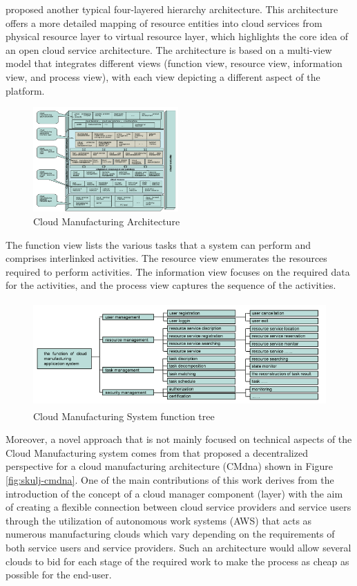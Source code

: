 \textcite{lv_multi-view_2012} proposed another typical four-layered hierarchy architecture. This architecture offers a more detailed mapping of resource entities into cloud services from physical resource layer to virtual resource layer, which highlights the core idea of an open cloud service architecture. The architecture is based on a multi-view model that integrates different views (function view, resource view, information view, and process view), with each view depicting a different aspect of the platform.


\begin{figure}[h]
    \centering
    \includegraphics[height=4cm, keepaspectratio]{images/lv-cmfg-architecture}
    \caption{\textcite{lv_multi-view_2012} Cloud Manufacturing Architecture}
    \label{fig:lv-cmfg-architecture}
\end{figure}

The function view lists the various tasks that a system can perform and comprises interlinked activities. The resource view enumerates the resources required to perform activities. The information view focuses on the required data for the activities, and the process view captures the sequence of the activities.

\begin{figure}[h]
    \centering
    \includegraphics[height=4cm, keepaspectratio]{images/lv-cmfg-function-tree}
    \caption{\textcite{lv_multi-view_2012} Cloud Manufacturing System function tree}
    \label{fig:lv-cmfg-function-tree}
\end{figure}


Moreover, a novel approach that is not mainly focused on technical aspects of the Cloud Manufacturing system comes from \textcite{skulj_decentralised_2015} that proposed a decentralized perspective for a cloud manufacturing architecture (CMdna) shown in Figure \ref{fig:skulj-cmdna}. One of the main contributions of this work derives from the introduction of the concept of a cloud manager component (layer) with the aim of creating a flexible connection between cloud service providers and service users through the utilization of autonomous work systems (AWS) that acts as numerous manufacturing clouds which vary depending on the requirements of both service users and service providers. Such an architecture would allow several clouds to bid for each stage of the required work to make the process as cheap as possible for the end-user.

